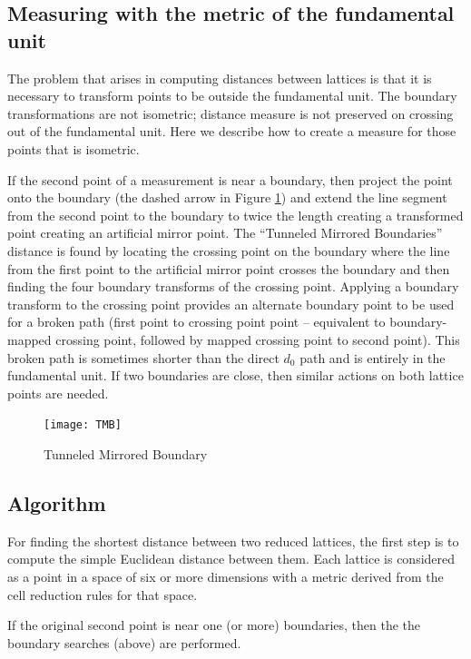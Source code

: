 \documentclass[preprint]{iucr}              %
\numberwithin{equation}{section}
\begin{document}
\subsection{Measuring with the metric of the fundamental unit}
\label{measure}
The problem that arises in computing distances between lattices
is that it is necessary to transform points to be outside the 
fundamental unit. The boundary transformations are not
isometric; distance measure is not preserved on crossing out
of the fundamental unit. Here we describe how to create a measure
for those points that is isometric.

If the second point of a measurement is near a boundary, then project the point
onto the boundary (the dashed arrow in Figure \ref{TMB}) and
extend the line segment from the second point to the boundary
to twice the length creating a transformed point creating
an artificial mirror point. The ``Tunneled Mirrored Boundaries'' distance is found by locating the crossing point on the boundary where
the line from the first point to the artificial mirror point
crosses the boundary and then finding the four boundary transforms
of the crossing point.
Applying a boundary transform to
the crossing point provides an alternate boundary point
to be used for a broken path (first point to crossing point
point -- equivalent to boundary-mapped crossing point, followed
by mapped crossing point to second point).  This broken
path is sometimes shorter than the direct $d_0$ path and
is entirely in the fundamental unit.  If two boundaries
are close, then similar actions on both lattice points are 
needed.

\begin{figure}
	\texttt{[image: TMB]}
\label{TMB}
	\caption{Tunneled Mirrored Boundary}
\end{figure}


\subsection{Algorithm}
	
	For finding the shortest distance between two reduced lattices, the first step
	is to compute the simple Euclidean distance between them.
	Each lattice is considered as a point in a space of six or
	more dimensions with a metric derived from the cell reduction
	rules for that space.
	
	If the original second point is near one (or more) boundaries, then the 
	the boundary searches (above) are performed. 
	
\end{document}
